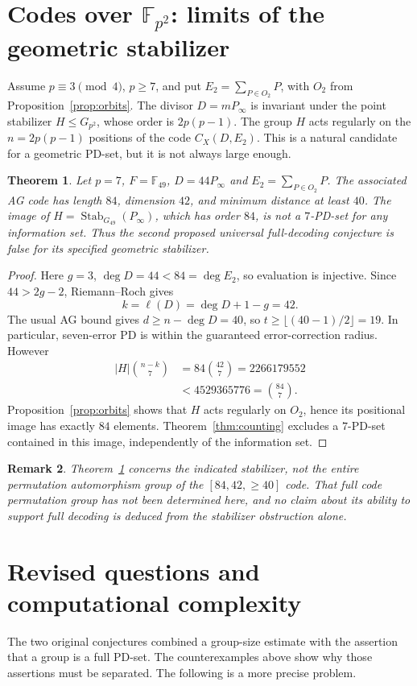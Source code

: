 \documentclass[12pt]{article}
\newtheorem{theorem}{Theorem}[section]
\newtheorem{remark}[theorem]{Remark}
\numberwithin{equation}{section}
\newcommand{\F}{\mathbb{F}}
\newcommand{\Stab}{\operatorname{Stab}}
\begin{document}
\section{Codes over $\F_{p^2}$: limits of the geometric stabilizer}
\label{sec:fp2-codes}
Assume $p\equiv3\pmod4$, $p\geq7$, and put
$E_2=\sum_{P\in O_2}P$, with $O_2$ from
Proposition~\ref{prop:orbits}.  The divisor
$D=mP_\infty$ is invariant under the point stabilizer
$H\leq G_{p^2}$, whose order is $2p(p-1)$.
The group $H$ acts regularly on the $n=2p(p-1)$
positions of the code $C_X(D,E_2)$.
This is a natural candidate for a geometric PD-set,
but it is not always large enough.

\begin{theorem}\label{thm:counter-fp2}
Let $p=7$, $F=\F_{49}$, $D=44P_\infty$ and
$E_2=\sum_{P\in O_2}P$.  The associated AG code has
length $84$, dimension $42$, and minimum distance at least
$40$.  The image of $H=\Stab_{G_{49}}(P_\infty)$,
which has order $84$, is \emph{not} a $7$-PD-set for
any information set.  Thus the second proposed
universal full-decoding conjecture is false for its
specified geometric stabilizer.
\end{theorem}
\begin{proof}
Here $g=3$, $\deg D=44<84=\deg E_2$, so evaluation
is injective.  Since $44>2g-2$, Riemann--Roch gives
\[
k=\ell(D)=\deg D+1-g=42.
\]
The usual AG bound gives $d\geq n-\deg D=40$,
so $t\geq\lfloor(40-1)/2\rfloor=19$.
In particular, seven-error PD is within the guaranteed
error-correction radius.  However
\begin{align*}
|H|\binom{n-k}{7}
&=84\binom{42}{7}=2266179552\\
&<4529365776=\binom{84}{7}.
\end{align*}
Proposition~\ref{prop:orbits} shows that $H$ acts
regularly on $O_2$, hence its positional image has
exactly $84$ elements.  Theorem~\ref{thm:counting}
excludes a $7$-PD-set contained in this image,
independently of the information set.
\end{proof}

\begin{remark}
Theorem~\ref{thm:counter-fp2} concerns the indicated
stabilizer, not the entire permutation automorphism group
of the $[84,42,\geq40]$ code.  That full code
permutation group has not been determined here, and
no claim about its ability to support full decoding
is deduced from the stabilizer obstruction alone.
\end{remark}

\section{Revised questions and computational complexity}
\label{sec:questions}
The two original conjectures combined a group-size estimate
with the assertion that a group is a full PD-set.  The
counterexamples above show why those assertions must be
separated.  The following is a more precise problem.
\end{document}
